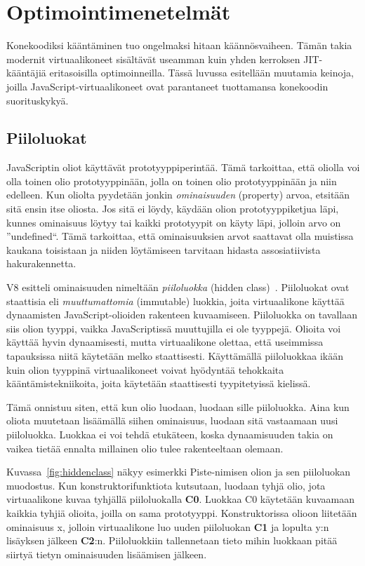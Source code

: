 \section{Optimointimenetelmät}

Konekoodiksi kääntäminen tuo ongelmaksi hitaan käännösvaiheen. Tämän takia modernit virtuaalikoneet sisältävät useamman kuin yhden kerroksen JIT-kääntäjiä eritasoisilla optimoinneilla. Tässä luvussa esitellään muutamia keinoja, joilla JavaScript-virtuaalikoneet ovat parantaneet tuottamansa konekoodin suorituskykyä.

\subsection{Piiloluokat}

JavaScriptin oliot käyttävät prototyyppiperintää. Tämä tarkoittaa, että oliolla voi olla toinen olio prototyyppinään, jolla on toinen olio prototyyppinään ja niin edelleen. Kun oliolta pyydetään jonkin \textit{ominaisuuden} (property) arvoa, etsitään sitä ensin itse oliosta. Jos sitä ei löydy, käydään olion prototyyppiketjua läpi, kunnes ominaisuus löytyy tai kaikki prototyypit on käyty läpi, jolloin arvo on ''undefined``. Tämä tarkoittaa, että ominaisuuksien arvot saattavat olla muistissa kaukana toisistaan ja niiden löytämiseen tarvitaan hidasta assosiatiivista hakurakennetta.

V8 esitteli ominaisuuden nimeltään \textit{piiloluokka} (hidden class)~\cite{v8design}. Piiloluokat ovat staattisia eli \textit{muuttumattomia} (immutable) luokkia, joita virtuaalikone käyttää dynaamisten JavaScript-olioiden rakenteen kuvaamiseen. Piiloluokka on tavallaan siis olion tyyppi, vaikka JavaScriptissä muuttujilla ei ole tyyppejä. Olioita voi käyttää hyvin dynaamisesti, mutta virtuaalikone olettaa, että useimmissa tapauksissa niitä käytetään melko staattisesti. Käyttämällä piiloluokkaa ikään kuin olion tyyppinä virtuaalikoneet voivat hyödyntää tehokkaita kääntämistekniikoita, joita käytetään staattisesti tyypitetyissä kielissä.

Tämä onnistuu siten, että kun olio luodaan, luodaan sille piiloluokka. Aina kun oliota muutetaan lisäämällä siihen ominaisuus, luodaan sitä vastaamaan uusi piiloluokka. Luokkaa ei voi tehdä etukäteen, koska dynaamisuuden takia on vaikea tietää ennalta millainen olio tulee rakenteeltaan olemaan.

Kuvassa~\ref{fig:hiddenclass} näkyy esimerkki Piste-nimisen olion ja sen piiloluokan muodostus. Kun konstruktorifunktiota kutsutaan, luodaan tyhjä olio, jota virtuaalikone kuvaa tyhjällä piiloluokalla \textbf{C0}. Luokkaa C0 käytetään kuvaamaan kaikkia tyhjiä olioita, joilla on sama prototyyppi. Konstruktorissa olioon liitetään ominaisuus x, jolloin virtuaalikone luo uuden piiloluokan \textbf{C1} ja lopulta y:n lisäyksen jälkeen \textbf{C2}:n. Piiloluokkiin tallennetaan tieto mihin luokkaan pitää siirtyä tietyn ominaisuuden lisäämisen jälkeen.

